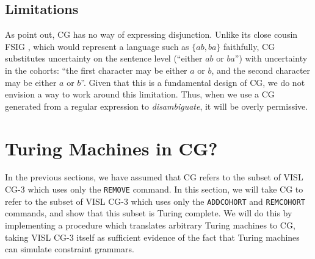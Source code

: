 \documentclass[11pt]{article}
\def\t#1{\texttt{#1}}
\begin{document}
\subsection{Limitations}
As  point out, CG has no way of expressing disjunction.
Unlike its close cousin FSIG \cite{koskenniemi90}, which would represent a 
language such as $\{ab,ba\}$ faithfully, CG substitutes uncertainty on the 
sentence level (``either $ab$ or $ba$'') with uncertainty in the cohorts: 
``the first character may be either $a$ or $b$, and the second character 
may be either $a$ or $b$''.
Given that this is a fundamental design of CG, we do not envision a way to work
around this limitation. Thus, when we use a CG generated from a regular
expression to \emph{disambiguate}, it will be overly permissive.


\section{Turing Machines in CG?}\label{sec:turingcomplete}
In the previous sections, we have assumed that CG refers to the subset of VISL
CG-3 which uses only the \t{REMOVE} command. In this section, we will take CG to
refer to the subset of VISL CG-3 which uses only the \t{ADDCOHORT} and
\t{REMCOHORT} commands, and show that this subset is Turing complete.
We will do this by implementing a procedure which translates arbitrary Turing
machines to CG, taking VISL CG-3 itself as sufficient evidence of the fact that
Turing machines can simulate constraint grammars.
\end{document}
